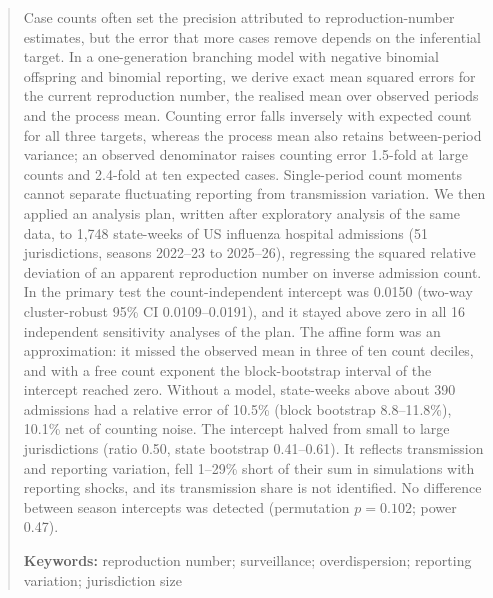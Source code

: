 \begin{abstract}
\noindent Case counts often set the precision attributed to reproduction-number estimates, but the error that more cases remove depends on the inferential target. In a one-generation branching model with negative binomial offspring and binomial reporting, we derive exact mean squared errors for the current reproduction number, the realised mean over observed periods and the process mean. Counting error falls inversely with expected count for all three targets, whereas the process mean also retains between-period variance; an observed denominator raises counting error 1.5-fold at large counts and 2.4-fold at ten expected cases. Single-period count moments cannot separate fluctuating reporting from transmission variation. We then applied an analysis plan, written after exploratory analysis of the same data, to 1,748 state-weeks of US influenza hospital admissions (51 jurisdictions, seasons 2022--23 to 2025--26), regressing the squared relative deviation of an apparent reproduction number on inverse admission count. In the primary test the count-independent intercept was 0.0150 (two-way cluster-robust 95\% CI 0.0109--0.0191), and it stayed above zero in all 16 independent sensitivity analyses of the plan. The affine form was an approximation: it missed the observed mean in three of ten count deciles, and with a free count exponent the block-bootstrap interval of the intercept reached zero. Without a model, state-weeks above about 390 admissions had a relative error of 10.5\% (block bootstrap 8.8--11.8\%), 10.1\% net of counting noise. The intercept halved from small to large jurisdictions (ratio 0.50, state bootstrap 0.41--0.61). It reflects transmission and reporting variation, fell 1--29\% short of their sum in simulations with reporting shocks, and its transmission share is not identified. No difference between season intercepts was detected (permutation $p=0.102$; power 0.47).

\medskip
\noindent\textbf{Keywords:} reproduction number; surveillance; overdispersion; reporting variation; jurisdiction size
\end{abstract}
